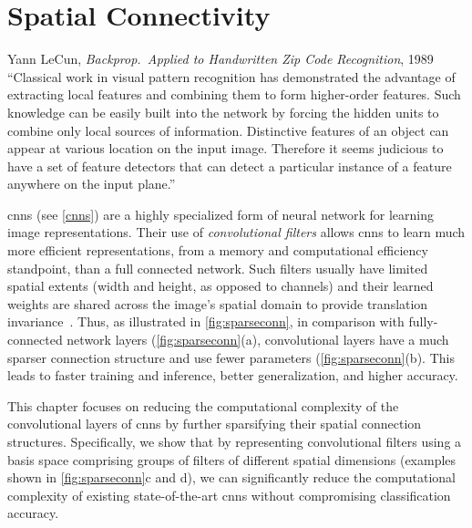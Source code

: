 \documentclass[thesis]{subfiles}
\begin{document}
	\chapter{Spatial Connectivity}\label{lowrankfilters}
	\begin{chapquote}{Yann LeCun, \textit{Backprop.\ Applied to Handwritten Zip Code Recognition}, 1989}
        ``Classical work in visual pattern recognition has demonstrated the advantage of extracting local features and combining them to form higher-order features. Such knowledge can be easily built into the network by forcing the hidden units to combine only local sources of information. Distinctive features of an object can appear at various location on the input image. Therefore it seems judicious to have a set of feature detectors that can detect a particular instance of a feature anywhere on the input plane.''
    \end{chapquote}
    
    \glspl{cnn} (see \cref{cnns}) are a highly specialized form of neural network for learning image representations. Their use of \emph{convolutional filters} allows \glspl{cnn} to learn much more efficient representations, from a memory and computational efficiency standpoint, than a full connected network. Such filters usually have limited spatial extents (\ie width and height, as opposed to channels) and their learned weights are shared across the image's spatial domain to provide translation invariance~\citep{Fuk80,Lecun1998}.
    Thus, as illustrated in \cref{fig:sparseconn}, in comparison with fully-connected network layers (\cref{fig:sparseconn}(a), convolutional layers have a much sparser connection structure and use fewer parameters (\cref{fig:sparseconn}(b).
    This leads to faster training and inference, better generalization, and higher accuracy.
    
    This chapter focuses on reducing the computational complexity of the convolutional layers of \glspl{cnn} by further sparsifying their spatial connection structures.  Specifically, we show that by representing convolutional filters using a basis space comprising groups of filters of different spatial dimensions (examples shown in \cref{fig:sparseconn}c and d), we can significantly reduce the computational complexity of existing state-of-the-art \glspl{cnn} without compromising classification accuracy.
    
\end{document}

